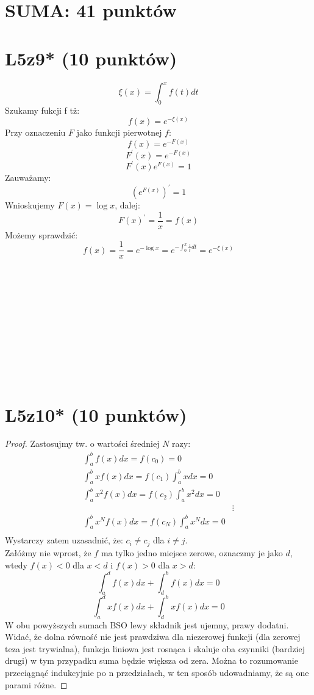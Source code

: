 \documentclass{article}
\title{}
\date{08.06.2020}
\author{Maurycy Borkowski}
\begin{document}
\maketitle

\section{SUMA: 41 punktów}
\section{L5z9* (10 punktów)}
$$
\xi(x) = \int_0^x{f(t)dt}
$$
Szukamy fukcji f tż:
$$
f(x) = e^{-\xi(x)}
$$
Przy oznaczeniu $F$ jako funkcji pierwotnej $f$:
$$
f(x) = e^{-F(x)}
$$
$$
F^\prime(x) = e^{-F(x)}
$$
$$
F^\prime(x)e^{F(x)} = 1
$$
Zauważamy:
$$
\left( e^{F(x)} \right)^\prime = 1
$$
Wnioskujemy $F(x) = \log x$, dalej:
$$
F(x)^\prime = \frac{1}{x} = f(x)
$$
Możemy sprawdzić:
$$
f(x) = \frac{1}{x} = e^{-\log x} = e^{-\int_0^x{\frac{1}{t}dt}} = e^{-\xi(x)}
$$\\\\\\\\\\\\\\\\\\\
\section{L5z10* (10 punktów)}
\begin{proof}
Zastosujmy tw. o wartości średniej $N$ razy:
\begin{align*}
\int_a^b f(x)dx = f(c_0) = 0\\
\int_a^b x f(x)dx = f(c_1)\int_a^b xdx = 0\\
\int_a^b x^2 f(x)dx = f(c_2)\int_a^b x^2dx = 0\\
   &\vdots\\
\int_a^b x^N f(x)dx = f(c_N)\int_a^b x^Ndx = 0\\
\end{align*}
Wystarczy zatem uzasadnić, że: $c_i \neq c_j$ dla $i \neq j$.\\
Załóżmy nie wprost, że $f$ ma tylko jedno miejsce zerowe, oznaczmy je jako $d$, wtedy $f(x) < 0$ dla $x < d$ i $f(x) > 0$ dla $x > d$:
$$
\int_a^d f(x)dx + \int_d^b f(x)dx = 0
$$
$$
\int_a^d x f(x)dx + \int_d^b x f(x)dx = 0
$$
W obu powyższych sumach BSO lewy składnik jest ujemny, prawy dodatni.\\
Widać, że dolna równość nie jest prawdziwa dla niezerowej funkcji (dla zerowej teza jest trywialna), funkcja liniowa jest rosnąca i skaluje oba czynniki (bardziej drugi) w tym przypadku suma będzie większa od zera. Można to rozumowanie przeciągnąć indukcyjnie po n przedziałach, w ten sposób udowadniamy, że są one parami różne.
\end{proof}
\end{document}
